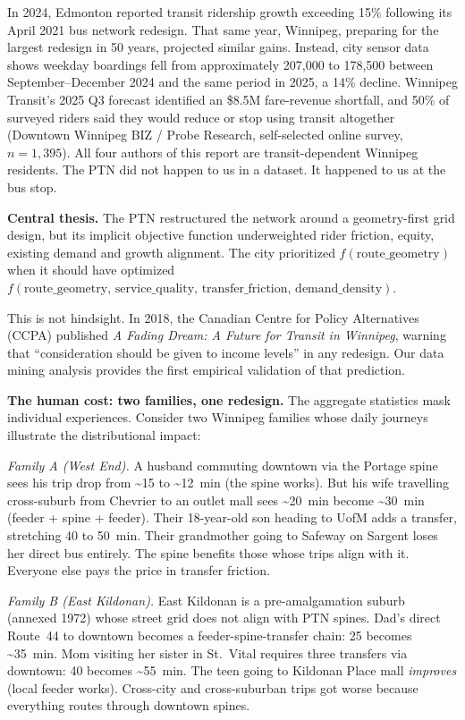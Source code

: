 \documentclass[11pt]{article}
\begin{document}
In 2024, Edmonton reported transit ridership growth exceeding 15\% following its April 2021 bus network redesign. That same year, Winnipeg, preparing for the largest redesign in 50 years, projected similar gains. Instead, city sensor data shows weekday boardings fell from approximately 207{,}000 to 178{,}500 between September--December 2024 and the same period in 2025, a 14\% decline. Winnipeg Transit's 2025 Q3 forecast identified an \$8.5M fare-revenue shortfall, and 50\% of surveyed riders said they would reduce or stop using transit altogether (Downtown Winnipeg BIZ / Probe Research, self-selected online survey, $n=1{,}395$). All four authors of this report are transit-dependent Winnipeg residents. The PTN did not happen to us in a dataset. It happened to us at the bus stop.

\textbf{Central thesis.} The PTN restructured the network around a geometry-first grid design, but its implicit objective function underweighted rider friction, equity, existing demand and growth alignment. The city prioritized $f(\text{route\_geometry})$ when it should have optimized $f(\text{route\_geometry},\, \text{service\_quality},\, \text{transfer\_friction},\, \text{demand\_density})$.

This is not hindsight. In 2018, the Canadian Centre for Policy Alternatives (CCPA) published \emph{A Fading Dream: A Future for Transit in Winnipeg}, warning that ``consideration should be given to income levels'' in any redesign. Our data mining analysis provides the first empirical validation of that prediction.

\textbf{The human cost: two families, one redesign.} The aggregate statistics mask individual experiences. Consider two Winnipeg families whose daily journeys illustrate the distributional impact:

\emph{Family A (West End).} A husband commuting downtown via the Portage spine sees his trip drop from \textasciitilde15 to \textasciitilde12~min (the spine works). But his wife travelling cross-suburb from Chevrier to an outlet mall sees \textasciitilde20~min become \textasciitilde30~min (feeder + spine + feeder). Their 18-year-old son heading to UofM adds a transfer, stretching 40 to 50~min. Their grandmother going to Safeway on Sargent loses her direct bus entirely. The spine benefits those whose trips align with it. Everyone else pays the price in transfer friction.

\emph{Family B (East Kildonan).} East Kildonan is a pre-amalgamation suburb (annexed 1972) whose street grid does not align with PTN spines. Dad's direct Route~44 to downtown becomes a feeder-spine-transfer chain: 25 becomes \textasciitilde35~min. Mom visiting her sister in St.~Vital requires three transfers via downtown: 40 becomes \textasciitilde55~min. The teen going to Kildonan Place mall \emph{improves} (local feeder works). Cross-city and cross-suburban trips got worse because everything routes through downtown spines.
\end{document}
